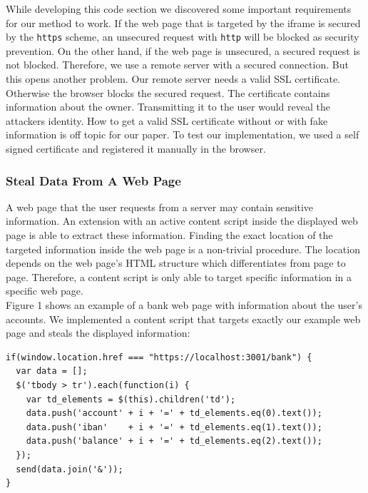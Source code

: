 \documentclass[article,colorback,accentcolor=tud9c,type=bsc]{tudthesis}
\let\stdsubsubsection\subsubsection
\renewcommand\subsubsection{\newpage\stdsubsubsection}
\begin{document}
	While developing this code section we discovered some important requirements for our method to work. If the web page that is targeted by the iframe is secured by the \texttt{https} scheme, an unsecured request with \texttt{http} will be blocked as security prevention. On the other hand, if the web page is unsecured, a secured request is not blocked. Therefore, we use a remote server with a secured connection. But this opens another problem. Our remote server needs a valid SSL certificate. Otherwise the browser blocks the secured request. The certificate contains information about the owner. Transmitting it to the user would reveal the attackers identity. How to get a valid SSL certificate without or with fake information is off topic for our paper. To test our implementation, we used a self signed certificate and registered it manually in the browser. \\
	
\subsubsection{Steal Data From A Web Page}
	
	A web page that the user requests from a server may contain sensitive information. An extension with an active content script inside the displayed web page is able to extract these information. Finding the exact location of the targeted information inside the web page is a non-trivial procedure. The location depends on the web page's HTML structure which differentiates from page to page. Therefore, a content script is only able to target specific information in a specific web page. \\

	Figure 1 shows an example of a bank web page with information about the user's accounts. We implemented a content script that targets exactly our example web page and steals the displayed information: 
	
	\begin{lstlisting}
if(window.location.href === "https://localhost:3001/bank") {
  var data = [];
  $('tbody > tr').each(function(i) {
    var td_elements = $(this).children('td');
    data.push('account' + i + '=' + td_elements.eq(0).text());
    data.push('iban'    + i + '=' + td_elements.eq(1).text());
    data.push('balance' + i + '=' + td_elements.eq(2).text());
  });
  send(data.join('&'));
}
	\end{lstlisting}
\end{document}
